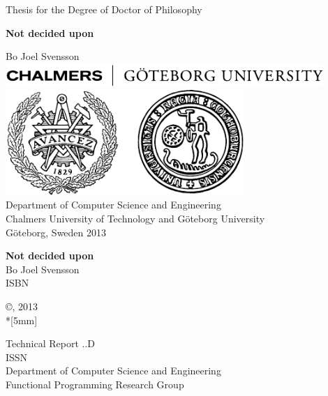 \documentclass[a4paper]{book}
\newcommand{\thesistitle}{Not decided upon}
\newcommand{\dept}{Department of Computer Science and Engineering}
\newcommand{\uni}{Chalmers University of Technology and G\"oteborg University}
\newcommand{\group}{Functional Programming Research Group}
\begin{document}
\begin{titlepage}
\begin{centering}
{\sc Thesis for the Degree of Doctor of Philosophy}
\vspace{30ex}

{\LARGE\bf\thesistitle}

\vspace{7ex}

\large Bo Joel Svensson
\vfill
\includegraphics[width=120mm]{./img/ChalmGUtextsvEng}\\[5mm]
\includegraphics[height=4cm]{./img/ChalmGUmarke}\\

\vspace{1cm}
\normalsize
{\sc \dept}\\
{\sc \uni}\\
G\"oteborg, Sweden 2013

\end{centering}
\end{titlepage}


\quad \vfill

{\noindent\large\bf\thesistitle} \\
\noindent Bo Joel Svensson \\
\noindent ISBN \\

\vspace{1cm}

\noindent\copyright {}, 2013 \\*[5mm]
\vspace{1cm} 

\noindent Technical Report ..D\\
\noindent ISSN                \\
\noindent \dept \\
\noindent \group\\
\end{document}
